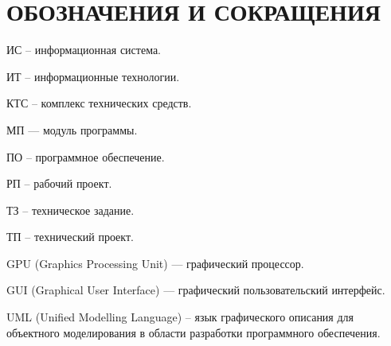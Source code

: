 \section*{ОБОЗНАЧЕНИЯ И СОКРАЩЕНИЯ}

ИС -- информационная система.

ИТ -- информационные технологии. 

КТС -- комплекс технических средств.

МП — модуль программы.

ПО -- программное обеспечение.

РП -- рабочий проект.

ТЗ -- техническое задание.

ТП -- технический проект.

GPU (Graphics Processing Unit) — графический процессор.

GUI (Graphical User Interface) — графический пользовательский интерфейс.

UML (Unified Modelling Language) -- язык графического описания для объектного моделирования в области разработки программного обеспечения.




